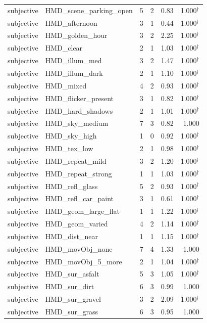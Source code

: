 \documentclass[11pt,a4paper]{article}
\begin{document}
\begin{longtable}{llrrrr}
subjective & HMD\_scene\_parking\_open & 5 & 2 & 0.83 & 1.000$^{\dagger}$ \\
subjective & HMD\_afternoon & 3 & 1 & 0.44 & 1.000$^{\dagger}$ \\
subjective & HMD\_golden\_hour & 3 & 2 & 2.25 & 1.000$^{\dagger}$ \\
subjective & HMD\_clear & 2 & 1 & 1.03 & 1.000$^{\dagger}$ \\
subjective & HMD\_illum\_med & 3 & 2 & 1.47 & 1.000$^{\dagger}$ \\
subjective & HMD\_illum\_dark & 2 & 1 & 1.10 & 1.000$^{\dagger}$ \\
subjective & HMD\_mixed & 4 & 2 & 0.93 & 1.000$^{\dagger}$ \\
subjective & HMD\_flicker\_present & 3 & 1 & 0.82 & 1.000$^{\dagger}$ \\
subjective & HMD\_hard\_shadows & 2 & 1 & 1.01 & 1.000$^{\dagger}$ \\
subjective & HMD\_sky\_medium & 7 & 3 & 0.82 & 1.000 \\
subjective & HMD\_sky\_high & 1 & 0 & 0.92 & 1.000$^{\dagger}$ \\
subjective & HMD\_tex\_low & 2 & 1 & 0.98 & 1.000$^{\dagger}$ \\
subjective & HMD\_repeat\_mild & 3 & 2 & 1.20 & 1.000$^{\dagger}$ \\
subjective & HMD\_repeat\_strong & 1 & 1 & 1.03 & 1.000$^{\dagger}$ \\
subjective & HMD\_refl\_glass & 5 & 2 & 0.93 & 1.000$^{\dagger}$ \\
subjective & HMD\_refl\_car\_paint & 3 & 1 & 0.61 & 1.000$^{\dagger}$ \\
subjective & HMD\_geom\_large\_flat & 1 & 1 & 1.22 & 1.000$^{\dagger}$ \\
subjective & HMD\_geom\_varied & 4 & 2 & 1.14 & 1.000$^{\dagger}$ \\
subjective & HMD\_dist\_near & 1 & 1 & 1.15 & 1.000$^{\dagger}$ \\
subjective & HMD\_movObj\_none & 7 & 4 & 1.33 & 1.000 \\
subjective & HMD\_movObj\_5\_more & 2 & 1 & 1.04 & 1.000$^{\dagger}$ \\
subjective & HMD\_sur\_asfalt & 5 & 3 & 1.05 & 1.000$^{\dagger}$ \\
subjective & HMD\_sur\_dirt & 6 & 3 & 0.99 & 1.000 \\
subjective & HMD\_sur\_gravel & 3 & 2 & 2.09 & 1.000$^{\dagger}$ \\
subjective & HMD\_sur\_grass & 6 & 3 & 0.95 & 1.000 \\

\end{longtable}
\end{document}
